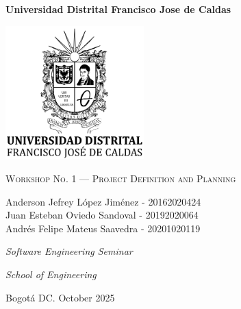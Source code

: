 \begin{titlepage}
	\centering
	{\bfseries\LARGE Universidad Distrital Francisco Jose de Caldas\par}
	{\includegraphics[width=0.4\textwidth]{Portada/logo}\par}
	\vfill
	{\scshape\Huge Workshop No. 1 — Project Definition and Planning \par}
	\vfill
	{\Large Anderson Jefrey López Jiménez - 20162020424 \\
Juan Esteban Oviedo Sandoval - 20192020064 \\
Andrés Felipe Mateus Saavedra - 20201020119 \par}
	\vfill
	\vfill
	{\itshape\Large Software Engineering Seminar \par}
	{\itshape\Large School of Engineering \par}
	{\Large Bogotá DC. October 2025 \par}
\end{titlepage}
